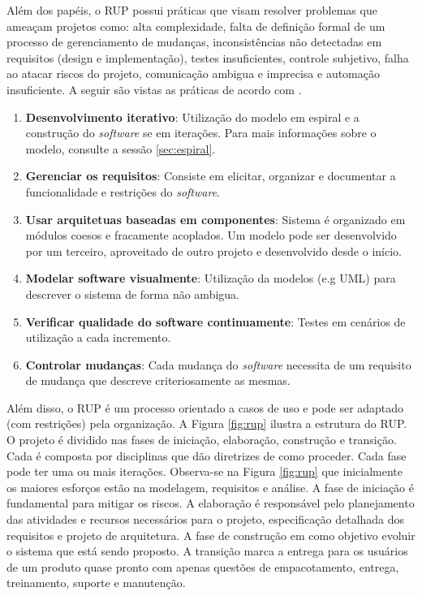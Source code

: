 Além dos papéis, o RUP possui práticas que visam resolver problemas que ameaçam projetos como: alta complexidade, falta de definição formal de um processo de gerenciamento de mudanças, inconsistências não detectadas em requisitos (design e implementação), testes insuficientes, controle subjetivo, falha ao atacar riscos do projeto, comunicação ambigua e imprecisa e automação insuficiente. A seguir são vistas as práticas de acordo com .

\begin{enumerate}
\item \textbf{Desenvolvimento iterativo}: Utilização do modelo em espiral e a construção do \textit{software} se em iterações. Para mais informações sobre o modelo, consulte a sessão \ref{sec:espiral}.
\item \textbf{Gerenciar os requisitos}: Consiste em elicitar, organizar e documentar a funcionalidade e restrições do \textit{software}.
\item \textbf{Usar arquitetuas baseadas em componentes}: Sistema é organizado em módulos coesos e fracamente acoplados. Um modelo pode ser desenvolvido por um terceiro, aproveitado de outro projeto e desenvolvido desde o início.
\item \textbf{Modelar software visualmente}: Utilização da modelos (e.g UML) para descrever o sistema de forma não ambigua.
\item \textbf{Verificar qualidade do software continuamente}: Testes em cenários de utilização a cada incremento.
\item \textbf{Controlar mudanças}: Cada mudança do \textit{software} necessita de um requisito de mudança que descreve criteriosamente as mesmas. 
\end{enumerate}
  
Além disso, o RUP é um processo orientado a casos de uso e pode ser adaptado (com restrições) pela organização. A Figura \ref{fig:rup} ilustra a estrutura do RUP. O projeto é dividido nas fases de iniciação, elaboração, construção e transição. Cada é composta por disciplinas que dão diretrizes de como proceder. Cada fase pode ter uma ou mais iterações. Observa-se na Figura \ref{fig:rup} que inicialmente os maiores esforços estão na modelagem, requisitos e análise. A fase de iniciação é fundamental para mitigar os riscos. A elaboração é responsável pelo planejamento das atividades e recursos necessários para o projeto, especificação detalhada dos requisitos e projeto de arquitetura. A fase de construção em como objetivo evoluir o sistema que está sendo proposto. A transição marca a entrega para os usuários de um produto quase pronto com apenas questões de empacotamento, entrega, treinamento, suporte e manutenção.



